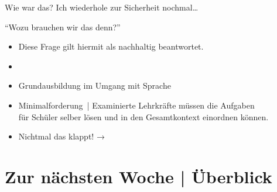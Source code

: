 \begin{frame}
  {Wie war das?}
  Ich wiederhole zur Sicherheit nochmal\ldots\\
  \Zeile
  \onslide<+->
  \begin{center}
    \Large{}
  \end{center}
\end{frame}

\begin{frame}
  {"`Wozu brauchen wir das denn?"'}
  \onslide<+->
  \begin{itemize}[<+->]
    \item Diese Frage gilt hiermit als nachhaltig beantwortet.
      \Zeile
    \item {}
    \item Grundausbildung im \alert{Umgang mit Sprache} 
      \Zeile
    \item Minimalforderung | \alert{Examinierte Lehrkräfte müssen die Aufgaben\\
         für Schüler selber lösen und in den Gesamtkontext einordnen können.}
       \item Nichtmal das klappt! → \citet{SchaeferSayatz2017a}
  \end{itemize}
\end{frame}

\section{Zur nächsten Woche | Überblick}

